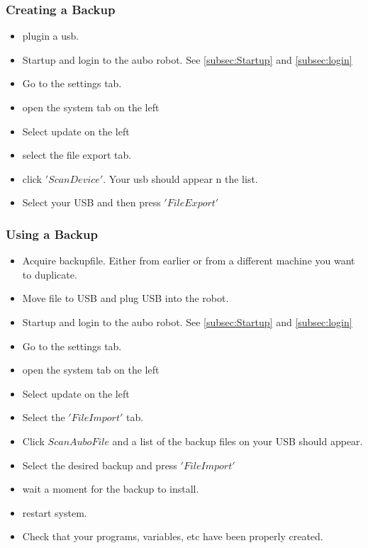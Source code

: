 \documentclass{article}
\begin{document}
\subsubsection{Creating a Backup}
\begin{itemize}
\item plugin a usb. 
\item Startup and login to the aubo robot. See \ref{subsec:Startup} and \ref{subsec:login}
\item Go to the settings tab.
\item open the system tab on the left
\item Select update on the left
\item select the file export tab. 
\item click $'Scan Device'$. Your usb should appear n the list. 
\item Select your USB and then press $'File Export'$
\end{itemize}

\subsubsection{Using a Backup}
\begin{itemize}
\item Acquire backupfile. Either from earlier or from a different machine you want to duplicate.
\item Move file to USB and plug USB into the robot.
\item Startup and login to the aubo robot. See \ref{subsec:Startup} and \ref{subsec:login}
\item Go to the settings tab.
\item open the system tab on the left
\item Select update on the left
\item Select the $'File Import'$ tab.
\item Click $Scan Aubo File$ and a list of the backup files on your USB should appear. 
\item Select the desired backup and press $'File Import'$
\item wait a moment for the backup to install. 
\item restart system. 
\item Check that your programs, variables, etc have been properly created.
\end{itemize}
\end{document}
